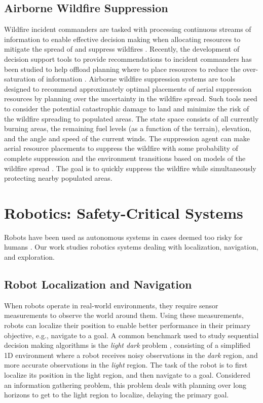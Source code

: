 \subsection{Airborne Wildfire Suppression}
Wildfire incident commanders are tasked with processing continuous streams of information to enable effective decision making when allocating resources to mitigate the spread of and suppress wildfires \cite{pyne1996introduction}.
Recently, the development of decision support tools to provide recommendations to incident commanders has been studied to help offload planning where to place resources to reduce the over-saturation of information \cite{griffith2017automated}.
Airborne wildfire suppression systems are tools designed to recommend approximately optimal placements of aerial suppression resources by planning over the uncertainty in the wildfire spread.
Such tools need to consider the potential catastrophic damage to land and minimize the risk of the wildfire spreading to populated areas.
The state space consists of all currently burning areas, the remaining fuel levels (as a function of the terrain), elevation, and the angle and speed of the current winds.
The suppression agent can make aerial resource placements to suppress the wildfire with some probability of complete suppression and the environment transitions based on models of the wildfire spread \cite{boychuk2009stochastic}.
The goal is to quickly suppress the wildfire while simultaneously protecting nearby populated areas. 


\section{Robotics: Safety-Critical Systems}
Robots have been used as autonomous systems in cases deemed too risky for humans \cite{guiochet2017safety}.
Our work studies robotics systems dealing with localization, navigation, and exploration.

\subsection{Robot Localization and Navigation}
When robots operate in real-world environments, they require sensor measurements to observe the world around them.
Using these measurements, robots can localize their position to enable better performance in their primary objective, e.g., navigate to a goal.
A common benchmark used to study sequential decision making algorithms is the \textit{light dark} problem \cite{platt2010belief}, consisting of a simplified 1D environment where a robot receives noisy observations in the \textit{dark} region, and more accurate observations in the \textit{light} region.
The task of the robot is to first localize its position in the light region, and then navigate to a goal.
Considered an information gathering problem, this problem deals with planning over long horizons to get to the light region to localize, delaying the primary goal.

